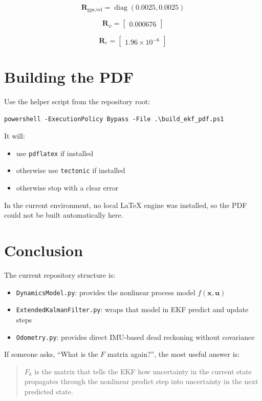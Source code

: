 \documentclass[11pt]{article}
\newcommand{\vect}[1]{\boldsymbol{#1}}
\newcommand{\mat}[1]{\mathbf{#1}}
\newcommand{\diag}{\operatorname{diag}}
\begin{document}
\begin{equation}
\mat{R}_{\text{gps,vel}} = \diag(0.0025, 0.0025)
\end{equation}

\begin{equation}
\mat{R}_{\psi} =
\begin{bmatrix}
0.000676
\end{bmatrix}
\end{equation}

\begin{equation}
\mat{R}_{r} =
\begin{bmatrix}
1.96\times 10^{-6}
\end{bmatrix}
\end{equation}

\section{Building the PDF}

Use the helper script from the repository root:

\begin{lstlisting}
powershell -ExecutionPolicy Bypass -File .\build_ekf_pdf.ps1
\end{lstlisting}

It will:

\begin{itemize}
    \item use \texttt{pdflatex} if installed
    \item otherwise use \texttt{tectonic} if installed
    \item otherwise stop with a clear error
\end{itemize}

In the current environment, no local LaTeX engine was installed, so the PDF could not be built automatically here.

\section{Conclusion}

The current repository structure is:

\begin{itemize}
    \item \texttt{DynamicsModel.py}: provides the nonlinear process model $f(\vect{x},\vect{u})$
    \item \texttt{ExtendedKalmanFilter.py}: wraps that model in EKF predict and update steps
    \item \texttt{Odometry.py}: provides direct IMU-based dead reckoning without covariance
\end{itemize}

If someone asks, ``What is the $F$ matrix again?'', the most useful answer is:

\begin{quote}
$F_k$ is the matrix that tells the EKF how uncertainty in the current state propagates through the nonlinear predict step into uncertainty in the next predicted state.
\end{quote}
\end{document}
